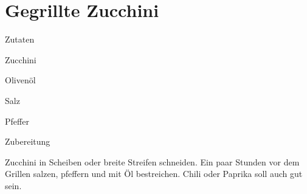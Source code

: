 \chapter*{Gegrillte Zucchini}
\begin{multicols}{2}
 {\Large Zutaten}
 \begin{Zutaten}
		\item Zucchini
		\item Olivenöl
		\item Salz
		\item Pfeffer
		
		
				
\end{Zutaten}
	
\columnbreak
\end{multicols}

{\Large Zubereitung} \newline
\begin{addmargin}[1cm]{0cm}
	Zucchini in Scheiben oder breite Streifen schneiden.\newline
	Ein paar Stunden vor dem Grillen salzen, pfeffern und mit Öl bestreichen.\newline
	Chili oder Paprika soll auch gut sein.
	
	
	
\end{addmargin}

